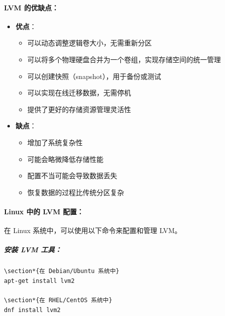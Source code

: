 \documentclass[12pt,UTF8]{ctexbook}
\begin{document}
\paragraph{LVM 的优缺点：}
\begin{itemize}
    \item \textbf{优点}：
        \begin{itemize}
            \item 可以动态调整逻辑卷大小，无需重新分区
            \item 可以将多个物理硬盘合并为一个卷组，实现存储空间的统一管理
            \item 可以创建快照（snapshot），用于备份或测试
            \item 可以实现在线迁移数据，无需停机
            \item 提供了更好的存储资源管理灵活性
        \end{itemize}
    \item \textbf{缺点}：
        \begin{itemize}
            \item 增加了系统复杂性
            \item 可能会略微降低存储性能
            \item 配置不当可能会导致数据丢失
            \item 恢复数据的过程比传统分区复杂
        \end{itemize}
\end{itemize}

\paragraph{Linux 中的 LVM 配置：}
在 Linux 系统中，可以使用以下命令来配置和管理 LVM。

\subparagraph{安装 LVM 工具：}
\begin{verbatim}
\section*{在 Debian/Ubuntu 系统中}
apt-get install lvm2

\section*{在 RHEL/CentOS 系统中}
dnf install lvm2
\end{verbatim}
\end{document}

